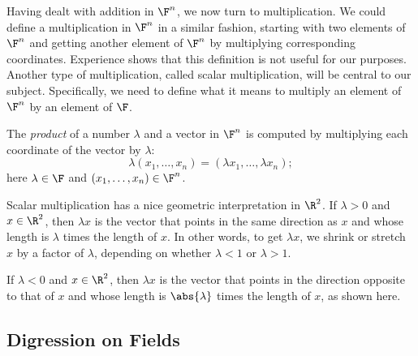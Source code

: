 Having dealt with addition in $\F^n$, we now turn to multiplication. We could
define a multiplication in $\F^n$ in a similar fashion, starting with two
elements of $\F^n$ and getting another element of $\F^n$ by multiplying
corresponding coordinates. Experience shows that this definition is not useful
for our purposes. Another type of multiplication, called scalar multiplication,
will be central to our subject. Specifically, we need to define what it means
to multiply an element of $\F^n$ by an element of $\F$.

\begin{definition}\label{ax:1.18}
The \emph{product} of a number $\lambda$ and a vector in $\F^n$ is computed by
multiplying each coordinate of the vector by $\lambda$:
\[ \lambda(x_1,\dots,x_n) = (\lambda x_1,\dots,\lambda x_n); \]
here $\lambda\in\F$ and $(x_1,\dots,x_n)\in\F^n$.
\end{definition}

%
Scalar multiplication has a nice geometric interpretation in $\R^2$. If
$\lambda>0$ and $x\in\R^2$, then $\lambda x$ is the vector that points in the
same direction as $x$ and whose length is $\lambda$ times the length of $x$. In
other words, to get $\lambda x$, we shrink or stretch $x$ by a factor of
$\lambda$, depending on whether $\lambda<1$ or $\lambda>1$.

%
If $\lambda<0$ and $x\in\R^2$, then $\lambda x$ is the vector that points in
the direction opposite to that of $x$ and whose length is $\abs{\lambda}$ times
the length of $x$, as shown here.

\subsection{Digression on Fields}

